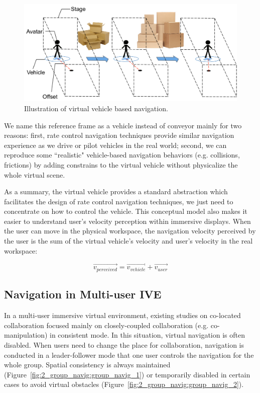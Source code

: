 \begin{figure}[htb]
  \centering
  \includegraphics[width=.8\textwidth]{figures/ch2/vehicle}
  \caption{\label{fig:2_vehicle}Illustration of virtual vehicle based navigation.}
\end{figure}

We name this reference frame as a vehicle instead of conveyor mainly for two reasons: first, rate control navigation techniques provide similar navigation experience as we drive or pilot vehicles in the real world; second, we can reproduce some ``realistic" vehicle-based navigation behaviors (e.g. collisions, frictions) by adding constrains to the virtual vehicle without physicalize the whole virtual scene.

As a summary, the virtual vehicle provides a standard abstraction which facilitates the design of rate control navigation techniques, we just need to concentrate on how to control the vehicle. This conceptual model also makes it easier to understand user's velocity perception within immersive displays. When the user can move in the physical workspace, the navigation velocity perceived by the user is the sum of the virtual vehicle's velocity and user's velocity in the real workspace: 

\begin{equation}
\overrightarrow{v_{perceived}} = \overrightarrow{v_{vehicle}} + \overrightarrow{v_{user}}
\end{equation}


\subsection{Navigation in Multi-user IVE}
In a multi-user immersive virtual environment, existing studies on co-located collaboration focused mainly on closely-coupled collaboration (e.g. co-manipulation) in consistent mode. In this situation, virtual navigation is often disabled. When users need to change the place for collaboration, navigation is conducted in a leader-follower mode that one user controls the navigation for the whole group. Spatial consistency is always maintained \citep{Beck2013IGG} (Figure~\ref{fig:2_group_navig:group_navig_1}) or temporarily disabled \citep{Kulik2011CSS} in certain cases to avoid virtual obstacles (Figure~\ref{fig:2_group_navig:group_navig_2}).

